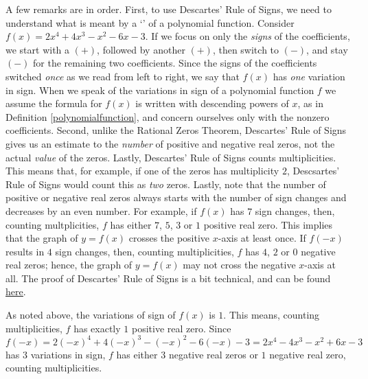 A few remarks are in order. First, to use Descartes' Rule of Signs, we need to understand what is meant by a `' of a polynomial function.  Consider $f(x) = 2x^4+4x^3-x^2-6x-3$.  If we focus on only the \textit{signs} of the coefficients, we start with a $(+)$, followed by another $(+)$, then switch to $(-)$, and stay $(-)$ for the remaining two coefficients.  Since the signs of the coefficients switched \textit{once} as we read from left to right, we say that $f(x)$ has \textit{one} variation in sign.  When we speak of the variations in sign of a polynomial function $f$ we assume the formula for $f(x)$ is written with descending powers of $x$, as in Definition \ref{polynomialfunction}, and concern ourselves only with the nonzero coefficients.  Second, unlike the Rational Zeros Theorem, Descartes' Rule of Signs gives us an estimate to the \textit{number} of positive and negative real zeros, not the actual \textit{value} of the zeros. Lastly, Descartes' Rule of Signs counts multiplicities.  This means that, for example, if one of the zeros has multiplicity $2$, Descsartes' Rule of Signs would count this as \textit{two} zeros.  Lastly, note that the number of positive or negative real zeros always starts with the number of sign changes and decreases by an even number.  For example, if $f(x)$ has $7$ sign changes, then, counting multplicities, $f$ has either $7$, $5$, $3$ or $1$ positive real zero.  This implies that the graph of $y=f(x)$ crosses the positive $x$-axis at least once.  If $f(-x)$ results in $4$ sign changes, then, counting multiplicities, $f$ has $4$, $2$ or $0$ negative real zeros;  hence, the graph of $y=f(x)$ may not cross the negative $x$-axis at all.  The proof of Descartes' Rule of Signs is a bit technical, and can be found \href{http://www.cut-the-knot.org/fta/ROS2.shtml}{\underline{here}}. 

{As noted above, the variations of sign of $f(x)$ is $1$. This means, counting multiplicities, $f$ has exactly $1$ positive real zero.  Since $f(-x)=2(-x)^4+4(-x)^3-(-x)^2-6(-x)-3=2x^4-4x^3-x^2+6x-3$ has $3$ variations in sign, $f$ has either $3$ negative real zeros or $1$ negative real zero, counting multiplicities.
}

